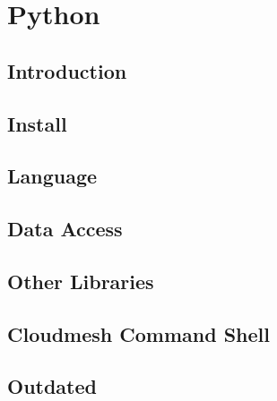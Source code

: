 

\part{Python}
\label{P:python}
\FILENAME


\chapter{Introduction}



\chapter{Install}





\chapter{Language}



\chapter{Data Access}



\chapter{Other Libraries}



\chapter{Cloudmesh Command Shell}



\chapter{Outdated}






